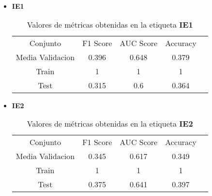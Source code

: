 \begin{itemize}
	\item \textbf{IE1}
	      \begin{table}[H]
		      \centering
		      \begin{tabular}{|c|c|c|c|c}
			      \cline{1-4}
			      Conjunto         & F1 Score & AUC Score & Accuracy \\ \cline{1-4}
			      Media Validacion & 0.396    & 0.648     & 0.379    \\ \cline{1-4}
			      Train            & 1        & 1         & 1        \\ \cline{1-4}
			      Test             & 0.315    & 0.6       & 0.364    \\ \cline{1-4}
		      \end{tabular}
		      \caption{Valores de métricas obtenidas en la etiqueta \textbf{IE1}}
	      \end{table}
	\item  \textbf{IE2}
	      \begin{table}[H]
		      \centering
		      \begin{tabular}{|c|c|c|c|c}
			      \cline{1-4}
			      Conjunto         & F1 Score & AUC Score & Accuracy \\ \cline{1-4}
			      Media Validacion & 0.345    & 0.617     & 0.349    \\ \cline{1-4}
			      Train            & 1        & 1         & 1        \\ \cline{1-4}
			      Test             & 0.375    & 0.641     & 0.397    \\ \cline{1-4}
		      \end{tabular}
		      \caption{Valores de métricas obtenidas en la etiqueta \textbf{IE2}}
	      \end{table}


\end{itemize}
